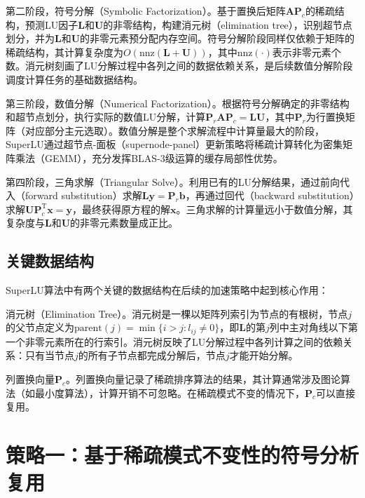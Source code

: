 第二阶段，符号分解（Symbolic Factorization）。基于置换后矩阵$\boldsymbol{A}\boldsymbol{P}_c$的稀疏结构，预测LU因子$\boldsymbol{L}$和$\boldsymbol{U}$的非零结构，构建消元树（elimination tree），识别超节点划分，并为$\boldsymbol{L}$和$\boldsymbol{U}$的非零元素预分配内存空间。符号分解阶段同样仅依赖于矩阵的稀疏结构，其计算复杂度为$O(\mathrm{nnz}(\boldsymbol{L}+\boldsymbol{U}))$，其中$\mathrm{nnz}(\cdot)$表示非零元素个数。消元树刻画了LU分解过程中各列之间的数据依赖关系，是后续数值分解阶段调度计算任务的基础数据结构。

第三阶段，数值分解（Numerical Factorization）。根据符号分解确定的非零结构和超节点划分，执行实际的数值LU分解，计算$\boldsymbol{P}_r \boldsymbol{A} \boldsymbol{P}_c = \boldsymbol{L}\boldsymbol{U}$，其中$\boldsymbol{P}_r$为行置换矩阵（对应部分主元选取）。数值分解是整个求解流程中计算量最大的阶段，SuperLU通过超节点-面板（supernode-panel）更新策略将稀疏计算转化为密集矩阵乘法（GEMM），充分发挥BLAS-3级运算的缓存局部性优势。

第四阶段，三角求解（Triangular Solve）。利用已有的LU分解结果，通过前向代入（forward substitution）求解$\boldsymbol{L}\boldsymbol{y} = \boldsymbol{P}_r\boldsymbol{b}$，再通过回代（backward substitution）求解$\boldsymbol{U}\boldsymbol{P}_c^{\mathrm{T}}\boldsymbol{x} = \boldsymbol{y}$，最终获得原方程的解$\boldsymbol{x}$。三角求解的计算量远小于数值分解，其复杂度与$\boldsymbol{L}$和$\boldsymbol{U}$的非零元素数量成正比。

\subsection{关键数据结构}

SuperLU算法中有两个关键的数据结构在后续的加速策略中起到核心作用：

消元树（Elimination Tree）。消元树是一棵以矩阵列索引为节点的有根树，节点$j$的父节点定义为$\mathrm{parent}(j) = \min\{i > j : l_{ij} \neq 0\}$，即$\boldsymbol{L}$的第$j$列中主对角线以下第一个非零元素所在的行索引。消元树反映了LU分解过程中各列计算之间的依赖关系：只有当节点$j$的所有子节点都完成分解后，节点$j$才能开始分解。

列置换向量$\boldsymbol{P}_c$。列置换向量记录了稀疏排序算法的结果，其计算通常涉及图论算法（如最小度算法），计算开销不可忽略。在稀疏模式不变的情况下，$\boldsymbol{P}_c$可以直接复用。

\section{策略一：基于稀疏模式不变性的符号分析复用}

